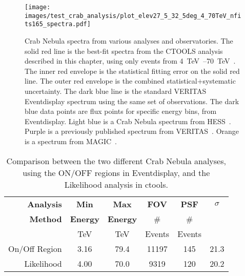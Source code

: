   \begin{figure}[!t]
    \centering
    \texttt{[image: images/test\_crab\_analysis/plot\_elev27\_5\_32\_5deg\_4\_70TeV\_nfits165\_spectra.pdf]}
    \caption[Crab Nebula Spectra]
    {
      Crab Nebula spectra from various analyses and observatories.
      The solid red line is the best-fit spectra from the CTOOLS analysis described in this chapter, using only events from \SIrange{4}{70}{\TeV{}}.
      The inner red envelope is the statistical fitting error on the solid red line.
      The outer red envelope is the combined statistical+systematic uncertainty.
      The dark blue line is the standard VERITAS Eventdisplay spectrum using the same set of observations.
      The dark blue data points are flux points for specific energy bins, from Eventdisplay.
      Light blue is a Crab Nebula spectrum from HESS~\cite{hess2006crab}.
      Purple is a previously published spectrum from VERITAS~\cite{veritas2015crab}.
      Orange is a spectrum from MAGIC~\cite{magic2015crab}.
    }
    \label{fig:crab_test_spectra}
  \end{figure}
    
  \begin{table}[!t]
    \centering
    \begin{tabular}{|r|c|c|c|c|c|}
      \hline
      \textbf{Analysis} & \textbf{Min}    & \textbf{Max}    & \textbf{FOV} & \textbf{PSF} & \textbf{$\sigma$} \\
      \textbf{Method}   & \textbf{Energy} & \textbf{Energy} &  \#          & \#           &                   \\
                        & TeV             & TeV             &  Events      & Events       &                   \\
      \hline 
      On/Off Region & 3.16 & 79.4 & 11197 & 145 & 21.3 \\
      Likelihood    & 4.00 & 70.0 & 9319  & 120 & 20.2 \\
      \hline 
    \end{tabular}
    \caption[Analysis Comparison]{
      Comparison between the two different Crab Nebula analyses, using the ON/OFF regions in Eventdisplay, and the Likelihood analysis in ctools.
    }
    \label{tab:crab_statistics}
  \end{table}

